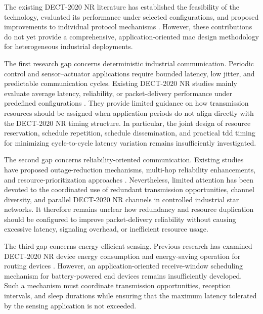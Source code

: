 \documentclass[12pt,a4paper]{article}
\begin{document}
The existing DECT-2020 NR literature has established the feasibility of the technology, evaluated its performance under selected configurations, and proposed improvements to individual protocol mechanisms
\cite{dhanwaniAssessmentCandidateTechnology2020,
anttonenEnablingMassiveMachine2021a,
pennerURLLCPerformanceEvaluation2021,
wassmannPerformanceDECT2020NR2024,
ahmadMACProtocolReducing2024,
nihtilaEnergyConsumptionDECT20202022}.
However, these contributions do not yet provide a comprehensive, application-oriented \gls{mac} design methodology for heterogeneous industrial deployments.

The first research gap concerns deterministic industrial communication. Periodic control and sensor--actuator applications require bounded latency, low jitter, and predictable communication cycles. Existing DECT-2020 NR studies mainly evaluate average latency, reliability, or packet-delivery performance under predefined configurations
\cite{pennerURLLCPerformanceEvaluation2021,
smidaETSIDECT2020Component2023,
llagunoPhysicalLayerPerformance2024,
bandaraExperimentalValidationAnalysis2025}.
They provide limited guidance on how transmission resources should be assigned when application periods do not align directly with the DECT-2020 NR timing structure. In particular, the joint design of resource reservation, schedule repetition, schedule dissemination, and practical \gls{tdd} timing for minimizing cycle-to-cycle latency variation remains insufficiently investigated.

The second gap concerns reliability-oriented communication. Existing studies have proposed outage-reduction mechanisms, multi-hop reliability enhancements, and resource-prioritization approaches
\cite{ahmadMACProtocolReducing2024,
ahmadMACLayerProtocolUltraReliable2025,
glazkovImprovingNearURLLCServices2025,
binasifIRSAssistedDECT2020NR2025}.
Nevertheless, limited attention has been devoted to the coordinated use of redundant transmission opportunities, channel diversity, and parallel DECT-2020 NR channels in controlled industrial star networks. It therefore remains unclear how redundancy and resource duplication should be configured to improve packet-delivery reliability without causing excessive latency, signaling overhead, or inefficient resource usage.

The third gap concerns energy-efficient sensing. Previous research has examined DECT-2020 NR device energy consumption and energy-saving operation for routing devices
\cite{nihtilaEnergyConsumptionDECT20202022,
nihtilaEnergySavingRouter2022}.
However, an application-oriented receive-window scheduling mechanism for battery-powered end devices remains insufficiently developed. Such a mechanism must coordinate transmission opportunities, reception intervals, and sleep durations while ensuring that the maximum latency tolerated by the sensing application is not exceeded.
\end{document}
